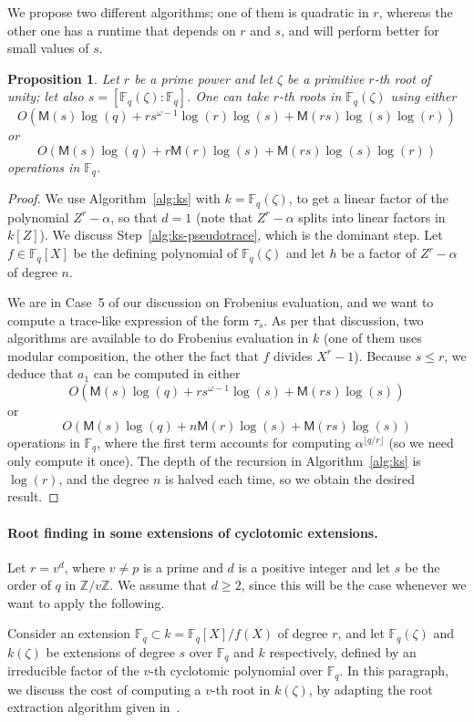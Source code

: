 \documentclass{mcom-l}
\theoremstyle{plain}
\newtheorem{proposition}[theorem]{Proposition}
\theoremstyle{definition}
\newcommand{\Z}{\ensuremath{\mathbb{Z}}}
\newcommand{\F}{\ensuremath{\mathbb{F}}}
\newcommand{\MM}{\ensuremath{\mathsf{M}}}
\newcounter{algorithm}
\begin{document}
We propose two different algorithms; one of them is quadratic in $r$,
whereas the other one has a runtime that depends on $r$ and $s$,
and will perform better for small values of $s$.

\begin{proposition}
  \label{prop:root-fpz}
  Let $r$ be a prime power and let $\zeta$ be a primitive $r$-th root of unity; let also $s = 
  [\F_q(\zeta): \F_q]$. One can take $r$-th roots in 
  $\F_q(\zeta)$ using either 
  $$O(\MM(s)\log(q) + rs^{\omega-1}\log(r)\log(s) + \MM(rs)\log(s)\log(r))$$
  or
  $$O(\MM(s)\log(q) + r\MM(r)\log(s) + \MM(rs)\log(s)\log(r))$$ operations in $\F_q$. 
\end{proposition}
\begin{proof}
We use Algorithm~\ref{alg:ks} with $k=\F_q(\zeta)$, to get a linear
factor of the polynomial $Z^r-\alpha$, so that $d=1$ (note that
$Z^r-\alpha$ splits into linear factors in $k[Z]$). We discuss
Step~\ref{alg:ks-pseudotrace}, which is the dominant step. Let $f \in
\F_q[X]$ be the defining polynomial of $\F_q(\zeta)$ and let $h$ be a
factor of $Z^r-\alpha$ of degree $n$. 

We are in Case~5 of our discussion on Frobenius evaluation, and we
want to compute a trace-like expression of the form $\tau_s$. As per
that discussion, two algorithms are available to do Frobenius
evaluation in $k$ (one of them uses modular composition, the other the
fact that $f$ divides $X^r-1$). Because $s \le r$, we deduce that
$a_1$ can be computed in either
$$O(\MM(s)\log(q) + rs^{\omega-1}\log(s) + \MM(rs)\log(s))$$
or
$$O(\MM(s)\log(q) + n\MM(r)\log(s) + \MM(rs)\log(s))$$ operations in
$\F_q$, where the first term accounts for computing $\alpha^{\lfloor
  q/r \rfloor}$ (so we need only compute it once). The depth of the
recursion in Algorithm~\ref{alg:ks} is $\log(r)$, and the degree $n$
is halved each time, so we obtain the
desired result.
\end{proof}

\paragraph{\bf Root finding in some extensions of cyclotomic extensions.}
Let $r = v^d$, where $v \ne p$ is a prime and $d$ is a positive
integer and let $s$ be the order of $q$ in $\Z / v\Z$.  We 
assume that $d \ge 2$, since this will be the case whenever we want to
apply the following.

Consider an extension $\F_q \subset k=\F_q[X]/f(X)$ of degree $r$, and
let $\F_q(\zeta)$ and $k(\zeta)$ be extensions of degree $s$ over
$\F_q$ and $k$ respectively, defined by an irreducible factor of the
$v$-th cyclotomic polynomial over $\F_q$. In this paragraph, we
discuss the cost of computing a $v$-th root in $k(\zeta)$, by adapting
the root extraction algorithm given in~\cite{doliskanischost2011}.
\end{document}
